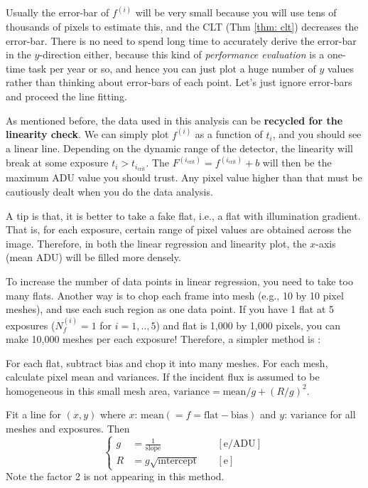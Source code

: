 Usually the error-bar of $ f^{(i)} $ will be very small because you will use tens of thousands of pixels to estimate this, and the CLT (Thm \ref{thm: clt}) decreases the error-bar. There is no need to spend long time to accurately derive the error-bar in the $ y $-direction either, because this kind of \textit{performance evaluation} is a one-time task per year or so, and hence you can just plot a huge number of $ y $ values rather than thinking about error-bars of each point. Let's just ignore error-bars and proceed the line fitting.

As mentioned before, the data used in this analysis can be \textbf{recycled for the linearity check}. We can simply plot $ f^{(i)} $ as a function of $ t_i $, and you should see a linear line. Depending on the dynamic range of the detector, the linearity will break at some exposure $ t_i > t_{i_\mathrm{crit}} $. The $ F^{(i_\mathrm{crit})} = f^{(i_\mathrm{crit})} + b $ will then be the maximum ADU value you should trust. Any pixel value higher than that must be cautiously dealt when you do the data analysis.

A tip is that, it is better to take a fake flat, i.e., a flat with illumination gradient. That is, for each exposure, certain range of pixel values are obtained across the image. Therefore, in both the linear regression and linearity plot, the $ x $-axis (mean ADU) will be filled more densely.

To increase the number of data points in linear regression, you need to take too many flats. Another way is to chop each frame into mesh (e.g., 10 by 10 pixel meshes), and use each such region as one data point. If you have 1 flat at 5 exposures ($ N_f^{(i)} = 1 $ for $ i = 1, .., 5 $) and flat is 1,000 by 1,000 pixels, you can make 10,000 meshes per each exposure! Therefore, a simpler method is :

\begin{thm} 
For each flat, subtract bias and chop it into many meshes. For each mesh, calculate pixel mean and variances. If the incident flux is assumed to be homogeneous in this small mesh area, $ \mathrm{variance} = \mathrm{mean}/g + (R/g)^2 $.

Fit a line for $ (x, y) $ where $ x $: $ \mathrm{mean} (= f = \mathrm{flat} - \mathrm{bias}) $ and $ y $: $ \mathrm{variance} $ for all meshes and exposures. Then
\begin{equation}
  \left \{
  \begin{aligned}
    g &= \frac{1}{\mathrm{slope}} &&~\mathrm{[e/ADU]} \\
    R &= g \sqrt{\mathrm{intercept}} &&~\mathrm{[e]}
  \end{aligned}
  \right .
\end{equation}
Note the factor 2 is not appearing in this method.
\end{thm}


